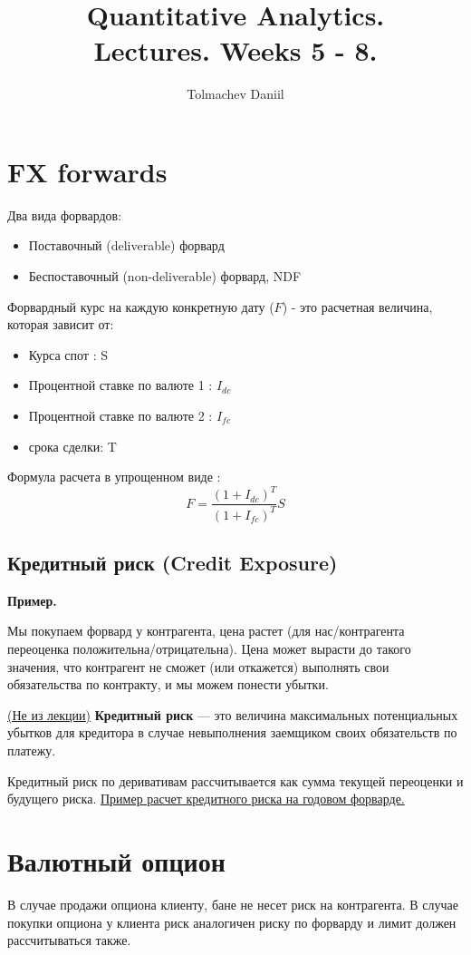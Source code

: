 \documentclass{article}
\title{Quantitative Analytics.\\
Lectures. Weeks 5 - 8. \\}
\author{Tolmachev Daniil}
\begin{document}
\maketitle

\setcounter{tocdepth}{1} 
\renewcommand\contentsname{Оглавление}
{
  \hypersetup{linkcolor=blue}
  \tableofcontents
}
\newpage

\section{FX forwards}
Два вида форвардов:
\begin{itemize}
\item
Поставочный (deliverable) форвард
\item
Беспоставочный (non-deliverable) форвард, NDF
\end{itemize}
Форвардный курс на каждую конкретную дату ($F$) - это расчетная величина, которая зависит от:
\begin{itemize}
\item
Курса спот\qquad\qquad\qquad\qquad\quad\; : S
\item
Процентной ставке по валюте 1 : $I_{dc}$
\item
Процентной ставке по валюте 2 : $I_{fc}$
\item
срока сделки\qquad\qquad\qquad\qquad\quad : T
\end{itemize}
Формула расчета в упрощенном виде : 
$$ F = \frac{(1+I_{dc})^T}{(1+I_{fc})^T}S $$
\subsection*{Кредитный риск (Credit Exposure)}
\textbf{Пример.}

Мы покупаем форвард у контрагента, цена растет (для нас/контрагента переоценка положительна/отрицательна). Цена может вырасти до такого значения,  что контрагент не сможет (или откажется) выполнять свои обязательства по контракту, и мы можем понести убытки. 

\href{https://www.investopedia.com/terms/c/credit-exposure.asp}{(Не из лекции)} \textbf{Кредитный риск} — это величина максимальных потенциальных убытков для кредитора в случае невыполнения заемщиком своих обязательств по платежу.

Кредитный риск по деривативам рассчитывается как сумма текущей переоценки и будущего риска. \href{https://youtu.be/ev2jSbH9G9U?t=952}{Пример расчет кредитного риска на годовом форварде.}
\section{Валютный опцион}
В случае продажи опциона клиенту, бане не несет риск на контрагента. В случае покупки опциона у клиента риск  аналогичен риску по форварду и лимит должен рассчитываться также.
\end{document}
